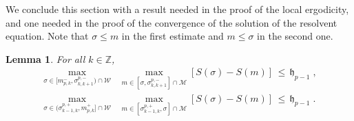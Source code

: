 \documentclass[reqno]{amsart}
\theoremstyle{plain}
\newtheorem{lemma}[theorem]{Lemma}
\theoremstyle{definition}
\newcommand{\mc}[1]{{\mathcal #1}}
\newcommand{\mf}[1]{{\mathfrak #1}}
\newcommand{\bb}[1]{{\mathbb #1}}
\newcommand{\<}{\langle}
\renewcommand{\>}{\rangle}
\begin{document}
We conclude this section with a result needed in the proof of the
local ergodicity, and one needed in the proof of the convergence of
the solution of the resolvent equation. Note that $\sigma\le m$ in the
first estimate and $m\le \sigma$ in the second one.

\begin{lemma}
\label{l17}
For all $k\in \bb Z$,
\begin{equation*}
\begin{gathered}
\max_{\sigma \in [m^-_{p,k}, \sigma^{p,-}_{k,k+1})  \cap \mc W}
\;\; \max_{m\in [\sigma, \sigma^{p,-}_{k,k+1}] \cap \mc M}
[S(\sigma)-S(m)]
\,\le\, \mf h_{p-1} \;,
\\
\max_{\sigma \in (\sigma^{p,+}_{k-1,k} , m^{+}_{p,k}]  \cap \mc W}
\;\; \max_{m\in [\sigma^{p,+}_{k-1,k} , \sigma] \cap \mc M}
[S(\sigma)-S(m)] \,\le\, \mf h_{p-1} \;.
\end{gathered}
\end{equation*}
\end{lemma}
\end{document}
